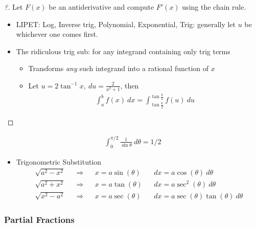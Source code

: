 \begin{proof}[?]

Let \(F(x)\) be an antiderivative and compute \(F'(x)\) using the chain
rule.


\begin{itemize}
\item
  LIPET: Log, Inverse trig, Polynomial, Exponential, Trig: generally let
  \(u\) be whichever one comes first.
\item
  The ridiculous trig sub: for any integrand containing only trig terms

  \begin{itemize}
  \item
    Transforms \emph{any} such integrand into a rational function of
    \(x\)
  \item
    Let \(u = 2\tan^{-1}x, ~du = \frac{2}{x^2+1}\), then
    \begin{align*}
    \int_a^b f(x)~dx = \int_{\tan\frac{a}{2}}^{\tan\frac{b}{2}} f(u)~du
    \end{align*}
  \end{itemize}
\end{itemize}

\end{proof}

\begin{example}[?]

\begin{align*}
\int_0^{\pi/2} \frac{1}{\sin \theta}~d\theta = 1/2
\end{align*}

\end{example}

\begin{itemize}
\tightlist
\item
  Trigonometric Substitution
  \begin{align*}
  \sqrt{a^2-x^2} && \Rightarrow && x = a\sin(\theta) &&dx = a\cos(\theta)~d\theta \\
  \sqrt{a^2+x^2} && \Rightarrow && x = a\tan(\theta) &&dx = a\sec^2(\theta)~d\theta \\
  \sqrt{x^2 - a^2} && \Rightarrow && x = a \sec(\theta) &&dx = a\sec(\theta)\tan(\theta)~d\theta
  \end{align*}
\end{itemize}

\hypertarget{partial-fractions}{%
\subsubsection{Partial Fractions}\label{partial-fractions}}

